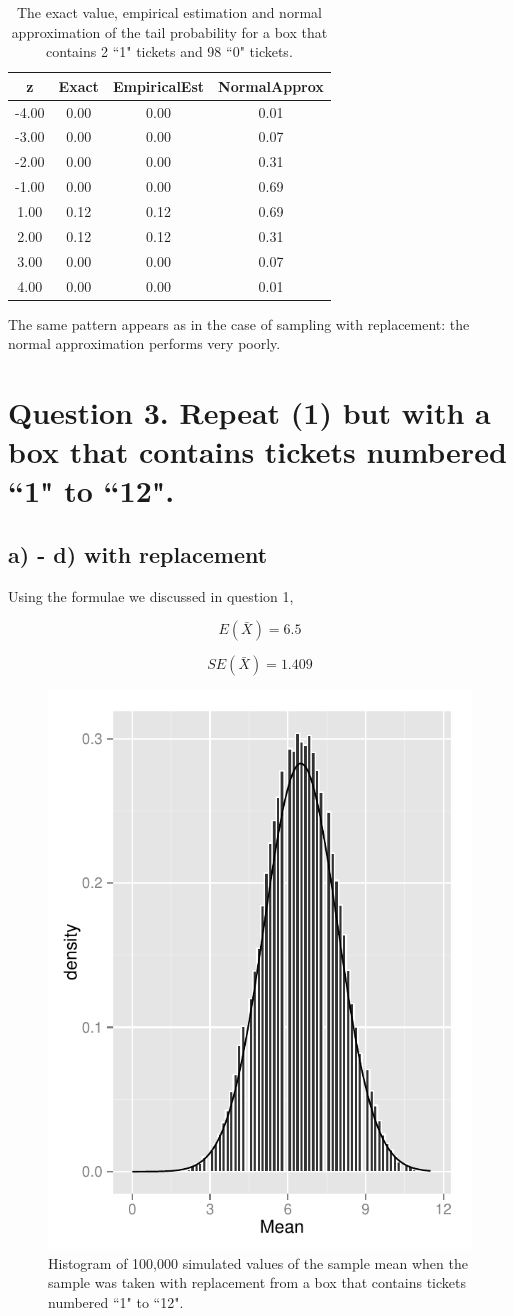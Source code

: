 \documentclass[11pt]{article}
\begin{document}
\begin{table}[H]
\centering
\begin{tabular}{|c|ccc|}
  \hline
z & Exact & EmpiricalEst & NormalApprox \\ 
  \hline
-4.00 & 0.00 & 0.00 & 0.01 \\ 
  -3.00 & 0.00 & 0.00 & 0.07 \\ 
  -2.00 & 0.00 & 0.00 & 0.31 \\ 
  -1.00 & 0.00 & 0.00 & 0.69 \\ 
  1.00 & 0.12 & 0.12 & 0.69 \\ 
  2.00 & 0.12 & 0.12 & 0.31 \\ 
  3.00 & 0.00 & 0.00 & 0.07 \\ 
  4.00 & 0.00 & 0.00 & 0.01 \\ 
   \hline
\end{tabular}
\caption{The exact value, empirical estimation and normal approximation of the tail probability for a box that contains 2 ``1" tickets and 98 ``0" tickets.} 
\end{table}


The same pattern appears as in the case of sampling with replacement: the normal approximation performs very poorly.


\pagebreak

 \section*{Question 3. Repeat (1) but with a box that contains tickets numbered ``1" to ``12".}
 
 \subsection*{a) - d) with replacement}
Using the formulae we discussed in question 1,

$$E(\bar{X})= 6.5$$ 
 
 $$SE(\bar{X}) = 1.409$$

 
\begin{figure}[H]
\centering
\includegraphics[width = .5\textwidth]{histogram_3c-1.pdf}
\caption{Histogram of 100,000 simulated values of the sample mean when the sample was taken with replacement from a box that contains tickets numbered ``1" to ``12".}\label{fig:q3c}
\end{figure}
 
\end{document}
